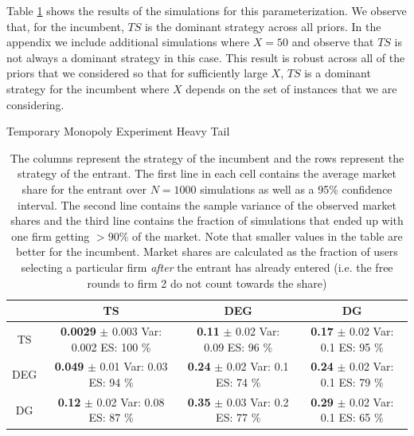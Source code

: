 \documentclass{article}
\theoremstyle{definition}
\begin{document}
Table \ref{ht_incum} shows the results of the simulations for this parameterization. We observe that, for the incumbent, $TS$ is the dominant strategy across all priors. In the appendix we include additional simulations where $X = 50$ and observe that $TS$ is not always a dominant strategy in this case. This result is robust across all of the priors that we considered so that for sufficiently large $X$, $TS$ is a dominant strategy for the incumbent where $X$ depends on the set of instances that we are considering.

\begin{table}[ht]
\centering
\caption{Temporary Monopoly Experiment Heavy Tail}
\begin{tabular}{c@{\hspace{1.0\tabcolsep}}ccc}
  \hline
 & TS & DEG &  DG \\
  \hline
TS & \makecell{\textbf{ 0.0029 } $\pm$ 0.003 \\Var: 0.002 \\ ES: 100 \%} & \makecell{\textbf{ 0.11 } $\pm$ 0.02 \\Var: 0.09 \\ ES: 96 \%} & \makecell{\textbf{ 0.17 } $\pm$ 0.02 \\Var: 0.1 \\ ES: 95 \%} \\
  DEG & \makecell{\textbf{ 0.049 } $\pm$ 0.01 \\Var: 0.03 \\ ES: 94 \%} & \makecell{\textbf{ 0.24 } $\pm$ 0.02 \\Var: 0.1 \\ ES: 74 \%} & \makecell{\textbf{ 0.24 } $\pm$ 0.02 \\Var: 0.1 \\ ES: 79 \%} \\
   DG & \makecell{\textbf{ 0.12 } $\pm$ 0.02 \\Var: 0.08 \\ ES: 87 \%} & \makecell{\textbf{ 0.35 } $\pm$ 0.03 \\Var: 0.2 \\ ES: 77 \%} & \makecell{\textbf{ 0.29 } $\pm$ 0.02 \\Var: 0.1 \\ ES: 65 \%} \\
   \hline
\end{tabular}
\caption*{\tiny{The columns represent the strategy of the incumbent and the rows represent the strategy of the entrant. The first line in each cell contains the average market share for the entrant over $N=1000$ simulations as well as a 95\% confidence interval. The second line contains the sample variance of the observed market shares and the third line contains the fraction of simulations that ended up with one firm getting $> 90\%$ of the market. Note that smaller values in the table are better for the incumbent. Market shares are calculated as the fraction of users selecting a particular firm \textit{after} the entrant has already entered (i.e. the free rounds to firm 2 do not count towards the share)}}
\label{ht_incum}
\end{table}
\end{document}
